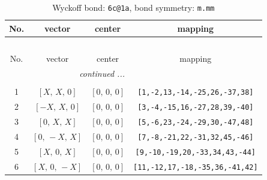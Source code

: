 \documentclass[fleqn,8pt]{jsarticle}
\begin{document}
\begin{longtable}{cccc}
\caption{Wyckoff bond: {\tt 6c@1a}, bond symmetry: {\tt m.mm}}
 \\
 \hline \hline
No. & vector & center & mapping \\ \hline \endfirsthead

\multicolumn{3}{l}{\tablename\ \thetable{}} \\
 \hline \hline
No. & vector & center & mapping \\ \hline \endhead

 \hline \hline
\multicolumn{3}{r}{\footnotesize\it continued ...} \\ \endfoot

 \hline \hline
\multicolumn{3}{r}{} \\ \endlastfoot

1 & $\left[ X,\, X,\, 0 \right]$ & $\left[ 0,\, 0,\, 0 \right]$ & {\tt [1,-2,13,-14,-25,26,-37,38]} \\ \hline
2 & $\left[ - X,\, X,\, 0 \right]$ & $\left[ 0,\, 0,\, 0 \right]$ & {\tt [3,-4,-15,16,-27,28,39,-40]} \\ \hline
3 & $\left[ 0,\, X,\, X \right]$ & $\left[ 0,\, 0,\, 0 \right]$ & {\tt [5,-6,23,-24,-29,30,-47,48]} \\ \hline
4 & $\left[ 0,\, - X,\, X \right]$ & $\left[ 0,\, 0,\, 0 \right]$ & {\tt [7,-8,-21,22,-31,32,45,-46]} \\ \hline
5 & $\left[ X,\, 0,\, X \right]$ & $\left[ 0,\, 0,\, 0 \right]$ & {\tt [9,-10,-19,20,-33,34,43,-44]} \\ \hline
6 & $\left[ X,\, 0,\, - X \right]$ & $\left[ 0,\, 0,\, 0 \right]$ & {\tt [11,-12,17,-18,-35,36,-41,42]} \\
\end{longtable}
\renewcommand{\arraystretch}{1.2}
\end{document}
